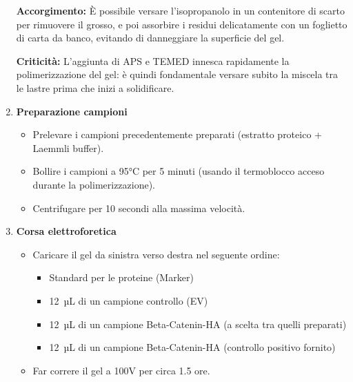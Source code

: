 \begin{enumerate}
        \begin{accorgimentoBox}
        \textbf{Accorgimento:}
        È possibile versare l’isopropanolo in un contenitore di scarto per rimuovere il grosso, e poi assorbire i residui delicatamente con un foglietto di carta da banco, evitando di danneggiare la superficie del gel.
    \end{accorgimentoBox}
    \begin{criticitaBox}
        \textbf{Criticità:}
        L’aggiunta di APS e TEMED innesca rapidamente la polimerizzazione del gel: è quindi fondamentale versare subito la miscela tra le lastre prima che inizi a solidificare.
    \end{criticitaBox}
\item \textbf{Preparazione campioni}
  \begin{itemize}
    \item Prelevare i campioni precedentemente preparati (estratto proteico + Laemmli buffer).
    \item Bollire i campioni a 95°C per 5 minuti (usando il termoblocco acceso durante la polimerizzazione).
    \item Centrifugare per 10 secondi alla massima velocità.
  \end{itemize}

\item \textbf{Corsa elettroforetica}
  \begin{itemize}
    \item Caricare il gel da sinistra verso destra nel seguente ordine:
      \begin{itemize}
        \item Standard per le proteine (Marker)
        \item 12~µL di un campione controllo (EV)
        \item 12~µL di un campione Beta-Catenin-HA (a scelta tra quelli preparati)
        \item 12~µL di un campione Beta-Catenin-HA (controllo positivo fornito)
      \end{itemize}
    \item Far correre il gel a 100V per circa 1.5 ore.
  \end{itemize}
\end{enumerate}
\newpage
